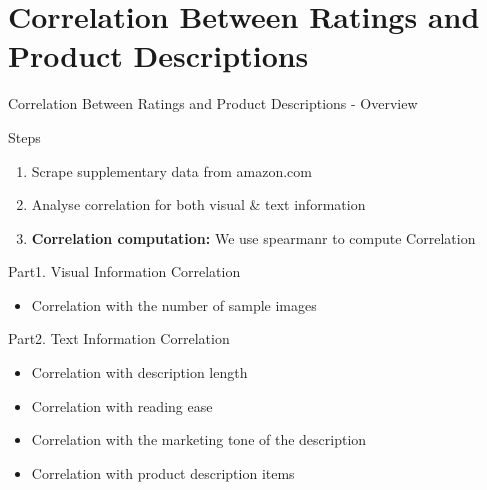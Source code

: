 \section{Correlation Between Ratings and Product Descriptions}

\begin{frame}{Correlation Between Ratings and Product Descriptions - Overview}

	\footnotesize

	\begin{block}{Steps}
		\begin{enumerate}
			\item Scrape supplementary data from amazon.com
			\item Analyse correlation for both visual \& text information
			\item \textbf{Correlation computation:} We use spearmanr to compute Correlation
		\end{enumerate}
	\end{block}
    
	\begin{block}{Part1. Visual Information Correlation}
		\begin{itemize}
			\item Correlation with the number of sample images
		\end{itemize}
	\end{block}
    
	\begin{block}{Part2. Text Information Correlation}
		\begin{itemize}
			\item Correlation with description length
			\item Correlation with reading ease
			\item Correlation with the marketing tone of the description
            \item Correlation with product description items
		\end{itemize}
	\end{block}
    
\end{frame}

